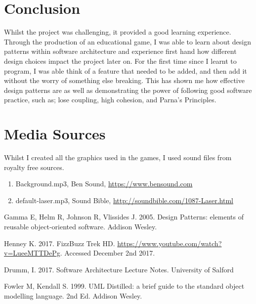 \documentclass[a4paper,12pt]{article}
\begin{document}
\section*{Conclusion}
Whilst the project was challenging, it provided a good learning experience. Through the production of an educational game, I was able to learn about design patterns within software architecture and experience first hand how different design choices impact the project later on. For the first time since I learnt to program, I was able think of a feature that needed to be added, and then add it without the worry of something else breaking. This has shown me how effective design patterns are as well as demonstrating the power of following good software practice, such as; lose coupling, high cohesion, and Parna's Principles. 

\section*{Media Sources}
Whilst I created all the graphics used in the games, I used sound files from royalty free sources.
\begin{enumerate}
	\item Background.mp3, Ben Sound, \url{https://www.bensound.com}
	\item default-laser.mp3, Sound Bible, \url{http://soundbible.com/1087-Laser.html}
\end{enumerate}


\begin{thebibliography}{9}
	Gamma E, Helm R, Johnson R, Vlissides J. 2005. Design Patterns: elements of reusable object-oriented software. Addison Wesley.
	
	Henney K. 2017. FizzBuzz Trek HD. \url{https://www.youtube.com/watch?v=LueeMTTDePg}. Accessed December 2nd 2017.
	
	Drumm, I. 2017. Software Architecture Lecture Notes. University of Salford
	
	Fowler M, Kendall S. 1999. UML Distilled: a brief guide to the standard object modelling language. 2nd Ed. Addison Wesley.
\end{thebibliography}
\end{document}
